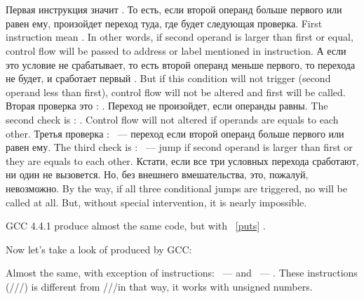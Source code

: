 ﻿\section{}
\label{sec:Jcc}







\IFRU
{Первая инструкция \JLE значит . То есть, если второй операнд больше первого или 
равен ему, произойдет переход туда, где будет следующая проверка.}
{First instruction \JLE mean . In other words, if second operand is 
larger than first or equal, control flow will be passed to address or label mentioned in instruction.}
\IFRU
{А если это условие не срабатывает, то есть второй операнд меньше первого, то перехода не будет, 
и сработает первый \printf.}
{But if this condition will not trigger (second operand less than first), control flow will 
not be altered and first \printf will be called.}
\IFRU
{Вторая проверка это \JNE: . Переход не произойдет, если операнды равны.}
{The second check is \JNE: . Control flow will not altered if operands are 
equals to each other.}
\IFRU
{Третья проверка \JGE:  ~--- переход если второй операнд больше 
первого или равен ему.}
{The third check is \JGE:  ~--- jump if second operand is larger 
than first or they are equals to each other.}
\IFRU
{Кстати, если все три условных перехода сработают, ни один \printf не вызовется. 
Но, без внешнего вмешательства, это, пожалуй, невозможно.}
{By the way, if all three conditional jumps are triggered, no \printf will be called at all. 
But, without special intervention, it is nearly impossible.}

GCC 4.4.1 
{produce almost the same code, but with} \puts~\ref{puts}  \printf.

{Now let's take a look of  produced by GCC:}



{Almost the same, with exception of instructions: \JBE ~---  
and \JAE ~--- .}
{These instructions (\JA/\JAE/\JB/\JBE) is different from \JG/\JGE/\JL/\JLE in that way, 
it works with unsigned numbers.}

